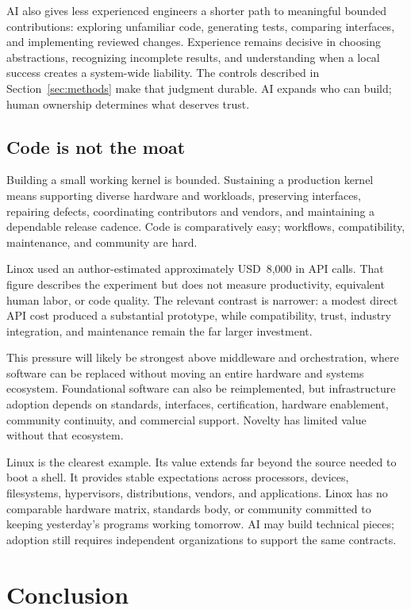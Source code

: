 \documentclass[11pt]{article}
\newcommand{\estimatedcost}{approximately USD~8,000}
\begin{document}
AI also gives less experienced engineers a shorter path to meaningful bounded
contributions: exploring unfamiliar code, generating tests, comparing
interfaces, and implementing reviewed changes. Experience remains decisive in
choosing abstractions, recognizing incomplete results, and understanding when a
local success creates a system-wide liability. The controls described in
Section~\ref{sec:methods} make that judgment durable. AI expands who can build;
human ownership determines what deserves trust.

\subsection{Code is not the moat}

Building a small working kernel is bounded. Sustaining a production kernel
means supporting diverse hardware and workloads, preserving interfaces,
repairing defects, coordinating contributors and vendors, and maintaining a
dependable release cadence. Code is comparatively easy; workflows,
compatibility, maintenance, and community are hard.

Linox used an author-estimated \estimatedcost{} in API calls. That figure
describes the experiment but does not measure productivity, equivalent human
labor, or code quality. The relevant contrast is narrower: a modest direct API
cost produced a substantial prototype, while compatibility, trust, industry
integration, and maintenance remain the far larger investment.

This pressure will likely be strongest above middleware and orchestration,
where software can be replaced without moving an entire hardware and systems
ecosystem. Foundational software can also be reimplemented, but infrastructure
adoption depends on standards, interfaces, certification, hardware enablement,
community continuity, and commercial support. Novelty has limited value without
that ecosystem.

Linux is the clearest example. Its value extends far beyond the source needed
to boot a shell. It provides stable expectations across processors, devices,
filesystems, hypervisors, distributions, vendors, and applications. Linox has
no comparable hardware matrix, standards body, or community committed to
keeping yesterday's programs working tomorrow. AI may build technical pieces;
adoption still requires independent organizations to support the same
contracts.

\section{Conclusion}
\end{document}
